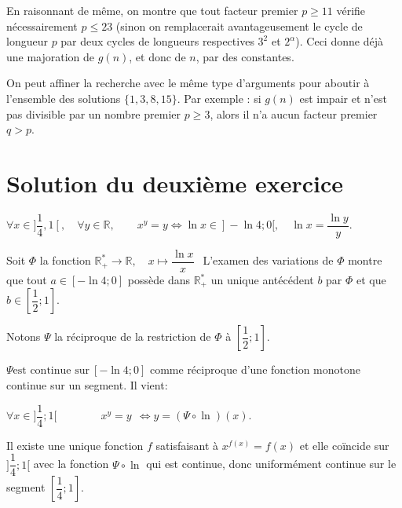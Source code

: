 En raisonnant de même, on montre que tout facteur premier $p \geq 11$ vérifie nécessairement $p \leq 23$ (sinon on remplacerait avantageusement le cycle de longueur $p$ par deux cycles de longueurs respectives $3^2$ et $2^\alpha$). Ceci donne déjà une majoration de $g(n)$, et donc de $n$, par des constantes.

On peut affiner la recherche avec le même type d'arguments pour aboutir à l'ensemble des solutions $\{1, 3,8,15\}$. Par exemple : si $g(n)$ est impair et n'est pas divisible par un nombre premier $p \geq 3$, alors il n'a aucun facteur premier $q > p$.


\section {Solution du deuxième exercice}%
$\forall x \in ]\dfrac 14, 1 [,\quad \forall y \in \mathbb R,\qquad  x^y= y \iff \ln x \in ]-\ln 4;0[, \quad \ln x = \dfrac {\ln y}y.$ 

Soit $\Phi$ la fonction $\mathbb R_+^* \to \mathbb R,\quad x \mapsto \dfrac {\ln x}x\:\:$ L'examen des variations  de $\Phi$  montre que tout $a \in [-\ln 4; 0] $ possède dans $\mathbb R_+^*$ un unique antécédent $b$ par $\Phi$ et que $b \in [\dfrac 12;1].$

Notons $ \Psi $ la réciproque de la restriction de $\Phi$ à $[ \dfrac 12 ; 1 ].$  

$\Psi   \text{est continue sur} \:[ -\ln 4; 0] $ comme réciproque d'une fonction monotone continue sur un segment. Il vient:

$ \forall x \in ]\dfrac 14; 1[\qquad \qquad x^y =y\:\:  \iff y = (\Psi \circ \ln) (x) $. 

Il existe une unique fonction $f$ satisfaisant à  $x ^{f(x)} = f(x) $ et elle coïncide sur $]\dfrac 14;1[$  avec la fonction $\Psi \circ \ln$  qui  est  continue,  donc uniformément continue sur le segment $[\dfrac 14; 1].$ 
